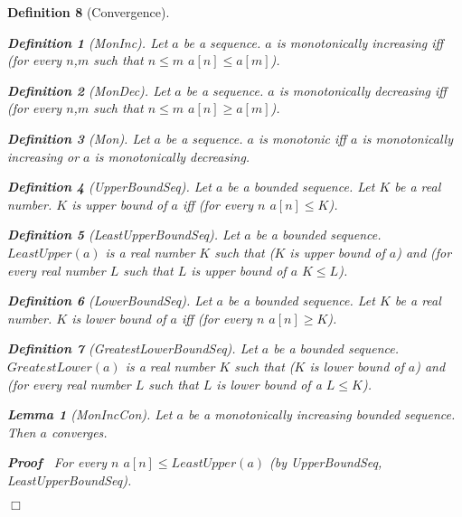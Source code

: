 \documentclass{article}
\newenvironment{forthel}{\begin{leftbar}}{\end{leftbar}}
\newenvironment{proof}{\noindent\textbf{Proof\ }}{\hspace*{\fill}$\Box$\medskip}
\newtheorem{lemma}{Lemma}
\newtheorem{definition}{Definition}
\begin{document}
\begin{forthel}
\begin{definition}[Convergence]
	
	\begin{definition}[MonInc]
		Let $a$ be a sequence. $a$ is monotonically increasing iff (for every $n$,$m$ such that $n \leq m$ $a[n] \leq a[m]$).
	\end{definition}
	
	\begin{definition}[MonDec]
		Let $a$ be a sequence. $a$ is monotonically decreasing iff (for every $n$,$m$ such that $n \leq m$ $a[n] \geq a[m]$).
	\end{definition}
	
	\begin{definition}[Mon]
		Let $a$ be a sequence. $a$ is monotonic iff $a$ is monotonically increasing or $a$ is monotonically decreasing.
	\end{definition}
	
	\begin{definition}[UpperBoundSeq]
		Let $a$ be a bounded sequence. Let $K$ be a real number. $K$ is upper bound of $a$ iff (for every $n$ $a[n] \leq K$).
	\end{definition}
	
	\begin{definition}[LeastUpperBoundSeq]
		Let $a$ be a bounded sequence. $LeastUpper(a)$ is a real number $K$ such that ($K$ is upper bound of $a$) and 
		(for every real number $L$ such that $L$ is upper bound of $a$ $K \leq L$).
	\end{definition}
	
	\begin{definition}[LowerBoundSeq]
		Let $a$ be a bounded sequence. Let $K$ be a real number. $K$ is lower bound of $a$ iff (for every $n$ $a[n] \geq K$).
	\end{definition}
	
	\begin{definition}[GreatestLowerBoundSeq]
		Let $a$ be a bounded sequence. $GreatestLower(a)$ is a real number $K$ such that ($K$ is lower bound of $a$) and
		(for every real number $L$ such that $L$ is lower bound of a $L \leq K$).
	\end{definition}
	
	\begin{lemma}[MonIncCon]
		Let $a$ be a monotonically increasing bounded sequence. Then $a$ converges.
	\end{lemma}
	
	\begin{proof}
		For every $n$ $a[n] \leq LeastUpper(a)$ (by UpperBoundSeq, LeastUpperBoundSeq).


\end{proof}
\end{definition}
\end{forthel}
\end{document}
